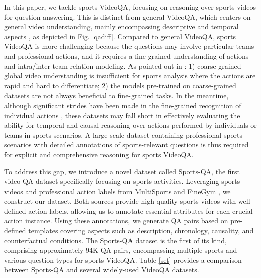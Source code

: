 In this paper, we tackle sports VideoQA, focusing on reasoning over sports videos for question answering. This is distinct from general VideoQA, which centers on general video understanding, mainly encompassing descriptive and temporal aspects \citep{jang2017tgif, xu2017video, xiao2021next, yu2019activitynet}, as depicted in Fig. \ref{qadiff}. %
Compared to general VideoQA, sports VideoQA is more challenging because the questions may involve particular teams and professional actions, and it requires a fine-grained understanding of actions and intra/inter-team relation modeling. %
As pointed out in \citep{shao2020finegym}: 1) coarse-grained global video understanding is insufficient for sports analysis where the actions are rapid and hard to differentiate; 2) the models pre-trained on coarse-grained datasets are not always beneficial to fine-grained tasks. 
In the meantime, although significant strides have been made in the fine-grained recognition of individual actions \citep{shao2020finegym,liu2022fineaction,sun2017taichi}, these datasets may fall short in effectively evaluating the ability for temporal and causal reasoning over actions performed by individuals or teams in sports scenarios.
A large-scale dataset containing professional sports scenarios with detailed annotations of sports-relevant questions is thus required for explicit and comprehensive reasoning for sports VideoQA.

To address this gap, we introduce a novel dataset called Sports-QA, the first video QA dataset specifically focusing on sports activities. Leveraging sports videos and professional action labels from MultiSports \citep{li2021multisports} and FineGym \citep{shao2020finegym}, we construct our dataset. Both sources provide high-quality sports videos with well-defined action labels, allowing us to annotate essential attributes for each crucial action instance. Using these annotations, we generate QA pairs based on pre-defined templates covering aspects such as description, chronology, causality, and counterfactual conditions. The Sports-QA dataset is the first of its kind, comprising approximately 94K QA pairs, encompassing multiple sports and various question types for sports VideoQA. Table \ref{set} provides a comparison between Sports-QA and several widely-used VideoQA datasets.

